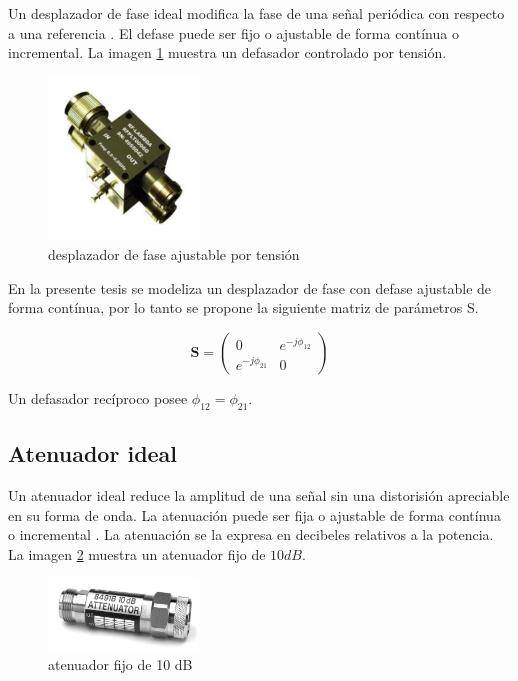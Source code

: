 Un desplazador de fase ideal modifica la fase de una señal periódica con respecto a una referencia \cite{Standard1996}. El 
defase puede ser fijo o ajustable de forma contínua o incremental. La imagen \ref{fig:phaseShifter} muestra un defasador 
controlado por tensión.

\begin{figure}[H]
 \centering
 \includegraphics[width=4cm]{gfx/phaseShifter.png}
 \caption{desplazador de fase ajustable por tensión \cite{Shifter}}
 \label{fig:phaseShifter}
\end{figure}

En la presente tesis se modeliza un desplazador de fase con defase ajustable de forma contínua, por lo tanto se propone la 
siguiente matriz de parámetros S.

$$
\mathbf{S} = \begin{pmatrix} 0 & e^{-j\phi_{12}}\\e^{-j\phi_{21}} & 0\end{pmatrix}
$$

Un defasador recíproco posee $\phi_{12} = \phi_{21}$.

\subsection{Atenuador ideal}

Un atenuador ideal reduce la amplitud de una señal sin una distorisión apreciable en su forma de onda. La atenuación puede ser
fija o ajustable de forma contínua o incremental \cite{Standard1996}. La atenuación se la expresa en decibeles relativos a la
potencia. La imagen \ref{fig:attenuator} muestra un atenuador fijo de $10 dB$.

\begin{figure}[H]
 \centering
 \includegraphics[width=4cm]{gfx/attenuator.png}
 \caption{atenuador fijo de 10 dB \cite{Keysight2014}}
 \label{fig:attenuator}
\end{figure}

